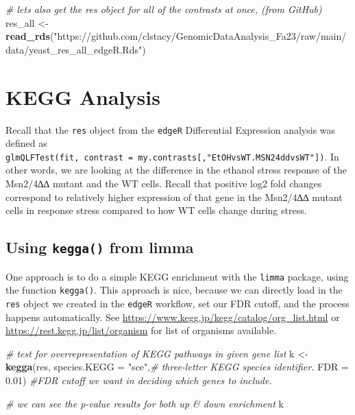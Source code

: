 \documentclass[
]{book}
\newenvironment{Shaded}{\begin{snugshade}}{\end{snugshade}}
\newcommand{\AttributeTok}[1]{\textcolor[rgb]{0.13,0.29,0.53}{#1}}
\newcommand{\CommentTok}[1]{\textcolor[rgb]{0.56,0.35,0.01}{\textit{#1}}}
\newcommand{\FloatTok}[1]{\textcolor[rgb]{0.00,0.00,0.81}{#1}}
\newcommand{\FunctionTok}[1]{\textcolor[rgb]{0.13,0.29,0.53}{\textbf{#1}}}
\newcommand{\NormalTok}[1]{#1}
\newcommand{\OtherTok}[1]{\textcolor[rgb]{0.56,0.35,0.01}{#1}}
\newcommand{\StringTok}[1]{\textcolor[rgb]{0.31,0.60,0.02}{#1}}
\begin{document}
\begin{Shaded}
\begin{Highlighting}[]
\CommentTok{\# let\textquotesingle{}s also get the res object for all of the contrasts at once, (from GitHub)}
\NormalTok{res\_all }\OtherTok{\textless{}{-}} \FunctionTok{read\_rds}\NormalTok{(}\StringTok{"https://github.com/clstacy/GenomicDataAnalysis\_Fa23/raw/main/data/yeast\_res\_all\_edgeR.Rds"}\NormalTok{)}
\end{Highlighting}
\end{Shaded}

\hypertarget{kegg-analysis-1}{%
\section{KEGG Analysis}\label{kegg-analysis-1}}

Recall that the \texttt{res} object from the \texttt{edgeR} Differential Expression analysis was defined as \texttt{glmQLFTest(fit,\ contrast\ =\ my.contrasts{[},"EtOHvsWT.MSN24ddvsWT"{]})}. In other words, we are looking at the difference in the ethanol stress response of the Msn2/4∆∆ mutant and the WT cells. Recall that positive log2 fold changes correspond to relatively higher expression of that gene in the Msn2/4∆∆ mutant cells in response stress compared to how WT cells change during stress.

\hypertarget{using-kegga-from-limma}{%
\subsection{\texorpdfstring{Using \texttt{kegga()} from limma}{Using kegga() from limma}}\label{using-kegga-from-limma}}

One approach is to do a simple KEGG enrichment with the \texttt{limma} package, using the function \texttt{kegga()}. This approach is nice, because we can directly load in the \texttt{res} object we created in the \texttt{edgeR} workflow, set our FDR cutoff, and the process happens automatically. See \url{https://www.kegg.jp/kegg/catalog/org_list.html} or \url{https://rest.kegg.jp/list/organism} for list of organisms available.

\begin{Shaded}
\begin{Highlighting}[]
\CommentTok{\# test for overrepresentation of KEGG pathways in given gene list}
\NormalTok{k }\OtherTok{\textless{}{-}} \FunctionTok{kegga}\NormalTok{(res,}
           \AttributeTok{species.KEGG =} \StringTok{"sce"}\NormalTok{,}\CommentTok{\# three{-}letter KEGG species identifier.}
           \AttributeTok{FDR =} \FloatTok{0.01}\NormalTok{) }\CommentTok{\#FDR cutoff we want in deciding which genes to include.}

\CommentTok{\# we can see the p{-}value results for both up \& down enrichment}
\NormalTok{k}
\end{Highlighting}
\end{Shaded}
\end{document}
